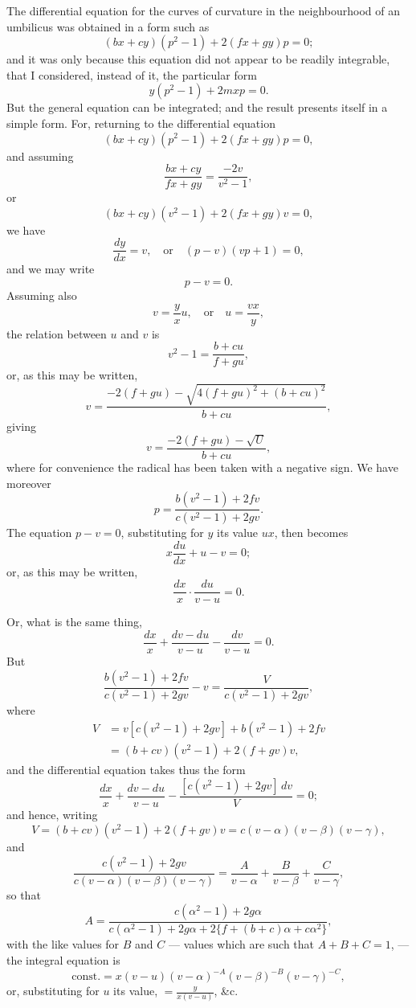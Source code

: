 \documentclass[11pt,a4paper]{article}
\begin{document}
\noindent The differential equation for the curves of curvature in the neighbourhood of an umbilicus was obtained in a form such as
\[
(bx+cy)(p^2-1) + 2(fx+gy)p = 0;
\]
and it was only because this equation did not appear to be readily integrable, that I considered, instead of it, the particular form
\[
y(p^2-1) + 2mxp = 0.
\]
But the general equation can be integrated; and the result presents itself in a simple form. For, returning to the differential equation
\[
(bx+cy)(p^2-1) + 2(fx+gy)p = 0,
\]
and assuming
\[
\frac{bx+cy}{fx+gy} = \frac{-2v}{v^2-1},
\]
or
\[
(bx+cy)(v^2-1) + 2(fx+gy)v = 0,
\]
we have
\[
\frac{dy}{dx} = v, \quad \text{or} \quad (p-v)(vp+1) = 0,
\]
and we may write
\[
p - v = 0.
\]
Assuming also
\[
v = \frac{y}{x}u, \quad \text{or} \quad u = \frac{vx}{y},
\]
the relation between $u$ and $v$ is
\[
v^2 - 1 = \frac{b+cu}{f+gu},
\]
or, as this may be written,
\[
v = \frac{-2(f+gu) - \sqrt{4(f+gu)^2 + (b+cu)^2}}{b+cu},
\]
giving
\[
v = \frac{-2(f+gu) - \sqrt{U}}{b+cu},
\]
where for convenience the radical has been taken with a negative sign. We have moreover
\[
p = \frac{b(v^2-1) + 2fv}{c(v^2-1) + 2gv}.
\]
The equation $p-v=0$, substituting for $y$ its value $ux$, then becomes
\[
x\frac{du}{dx} + u - v = 0;
\]
or, as this may be written,
\[
\frac{dx}{x} \cdot \frac{du}{v-u} = 0.
\]

\bigskip
\noindent Or, what is the same thing,
\[
\frac{dx}{x} + \frac{dv - du}{v-u} - \frac{dv}{v-u} = 0.
\]
But
\[
\frac{b(v^2-1) + 2fv}{c(v^2-1) + 2gv} - v = \frac{V}{c(v^2-1) + 2gv},
\]
where
\begin{align*}
V &= v[c(v^2-1) + 2gv] + b(v^2-1) + 2fv \\
&= (b+cv)(v^2-1) + 2(f+gv)v,
\end{align*}
and the differential equation takes thus the form
\[
\frac{dx}{x} + \frac{dv - du}{v-u} - \frac{[c(v^2-1) + 2gv]\,dv}{V} = 0;
\]
and hence, writing
\[
V = (b+cv)(v^2-1) + 2(f+gv)v = c(v-\alpha)(v-\beta)(v-\gamma),
\]
and
\[
\frac{c(v^2-1) + 2gv}{c(v-\alpha)(v-\beta)(v-\gamma)} = \frac{A}{v-\alpha} + \frac{B}{v-\beta} + \frac{C}{v-\gamma},
\]
so that
\[
A = \frac{c(\alpha^2-1) + 2g\alpha}{c(\alpha^2-1) + 2g\alpha + 2\{f + (b+c)\alpha + c\alpha^2\}},
\]
with the like values for $B$ and $C$ --- values which are such that $A+B+C=1$, --- the integral equation is
\[
\text{const.} = x(v-u)(v-\alpha)^{-A}(v-\beta)^{-B}(v-\gamma)^{-C},
\]
or, substituting for $u$ its value, $= \frac{y}{x(v-u)}$, \&c.
\end{document}
